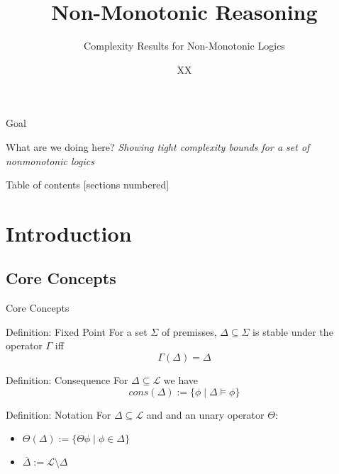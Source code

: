 \documentclass[usenames,dvipsnames, 8pt]{beamer}
\title{Non-Monotonic Reasoning}
\subtitle{Complexity Results for Non-Monotonic Logics}
\date{}
\author{XX}
\begin{document}
\maketitle

\begin{frame}{Goal}
\begin{block}{What are we doing here?}
\textit{Showing tight complexity bounds for a set of nonmonotonic logics}
\end{block}
\end{frame}

\begin{frame}{Table of contents}
  [sections numbered]
  \tableofcontents[subsubsectionstyle=hide]
\end{frame}




\section{Introduction}



\subsection{Core Concepts}

\begin{frame}{Core Concepts}
\begin{block}{Definition: Fixed Point}
For a set $\Sigma$ of premisses, $\Delta \subseteq \Sigma$ is stable under the operator $\Gamma$ iff
\begin{equation*}
\Gamma(\Delta) = \Delta
\end{equation*}
\end{block}

\begin{block}{Definition: Consequence}
For $\Delta \subseteq  \mathcal{L}$ we have 
\begin{equation*}
cons(\Delta):=\{\phi \mid \Delta \models \phi\}
\end{equation*} 
\end{block}

\begin{block}{Definition: Notation}
For $\Delta \subseteq  \mathcal{L}$ and and an unary operator $\Theta$:
\begin{itemize}
\item $\Theta(\Delta):= \{\Theta\phi \mid \phi \in \Delta\}$
\item $\overline{\Delta} := \mathcal{L} \setminus \Delta$
\end{itemize}
\end{block}


\end{frame}
\end{document}
